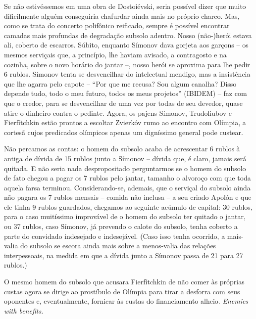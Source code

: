 Se não estivéssemos em uma obra de Dostoiévski, seria possível dizer que
muito dificilmente alguém conseguiria chafurdar ainda mais no próprio
charco. Mas, como se trata do concerto polifônico reificado, sempre é
possível encontrar camadas mais profundas de degradação subsolo adentro.
Nosso (não-)herói estava ali, coberto de escarros. Súbito, enquanto
Símonov dava gorjeta aos garçons -- os mesmos serviçais que, a
princípio, lhe haviam avisado, a contragosto e na cozinha, sobre o novo
horário do jantar --, nosso herói se aproxima para lhe pedir 6 rublos.
Símonov tenta se desvencilhar do intelectual mendigo, mas a insistência
que lhe agarra pelo capote -- ``Por que me recusa? Sou algum canalha?
Disso depende tudo, todo o meu futuro, todos os meus projetos'' (IBIDEM)
-- faz com que o credor, para se desvencilhar de uma vez por todas de
seu devedor, quase atire o dinheiro contra o pedinte. Agora, os pajens
Símonov, Trudoliubov e Fierfítchkin estão prontos a escoltar Zvierkóv
rumo ao encontro com Olímpia, a cortesã cujos predicados olímpicos
apenas um digníssimo general pode custear.

Não percamos as contas: o homem do subsolo acaba de acrescentar 6 rublos
à antiga de dívida de 15 rublos junto a Símonov -- dívida que, é claro,
jamais será quitada. E não seria nada despropositado perguntarmos se o
homem do subsolo de fato chegou a pagar os 7 rublos pelo jantar, tamanho
o alvoroço com que toda aquela farsa terminou. Considerando-se, ademais,
que o serviçal do subsolo ainda não pagara os 7 rublos mensais -- comida
não inclusa -- a seu criado Apolón e que ele tinha 9 rublos guardados,
chegamos ao seguinte acúmulo de capital: 30 rublos, para o caso
muitíssimo improvável de o homem do subsolo ter quitado o jantar, ou 37
rublos, caso Símonov, já prevendo o calote do subsolo, tenha coberto a
parte do convidado indesejado e indesejável. (Caso isso tenha ocorrido,
a mais-valia do subsolo se escora ainda mais sobre a menos-valia das
relações interpessoais, na medida em que a dívida junto a Símonov passa
de 21 para 27 rublos.)

O mesmo homem do subsolo que acusara Fierfítchkin de não comer às
próprias custas agora se dirige ao prostíbulo de Olímpia para tirar a
desforra com seus oponentes e, eventualmente, fornicar às custas do
financiamento alheio. \emph{Enemies with benefits. }

